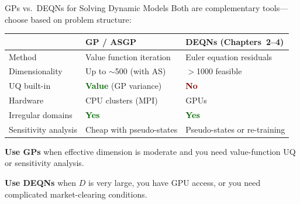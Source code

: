 \documentclass[aspectratio=169,11pt]{beamer}
\newcommand{\emphc}[1]{\textcolor{harvardcrimson}{#1}}
\begin{document}
\begin{frame}{GPs vs.\ DEQNs for Solving Dynamic Models}
Both are \emphc{complementary tools}---choose based on problem structure:

\vspace{0.3em}
\begin{center}
\scriptsize
\renewcommand{\arraystretch}{1.15}
\begin{tabular}{p{2.8cm} p{3.8cm} p{3.8cm}}
\toprule
 & \textbf{GP / ASGP} & \textbf{DEQNs (Chapters~2--4)} \\
\midrule
Method & Value function iteration & Euler equation residuals \\
Dimensionality & Up to $\sim$500 (with AS) & $>$1000 feasible \\
UQ built-in & \textcolor{darkgreen}{\textbf{Value}} (GP variance) & \textcolor{darkred}{\textbf{No}} \\
Hardware & CPU clusters (MPI) & GPUs \\
Irregular domains & \textcolor{darkgreen}{\textbf{Yes}} & \textcolor{darkgreen}{\textbf{Yes}} \\
Sensitivity analysis & Cheap with pseudo-states & Pseudo-states or re-training \\
\bottomrule
\end{tabular}
\end{center}

\vspace{0.3em}
\small
\textbf{Use GPs} when effective dimension is moderate and you need value-function UQ or sensitivity analysis.

\textbf{Use DEQNs} when $D$ is very large, you have GPU access, or you need complicated market-clearing conditions.
\end{frame}
\end{document}
